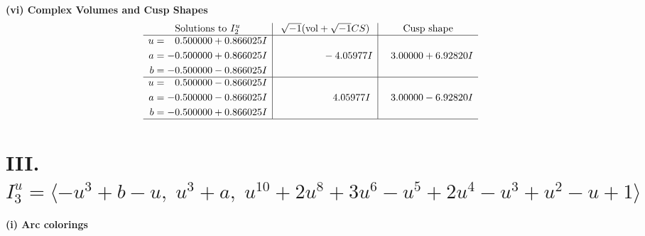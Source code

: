 \documentclass[1p]{elsarticle_modified}
\theoremstyle{definition}
\newcommand{\I}{\sqrt{-1}}
\begin{document}
\newpage\flushleft \textbf{(vi) Complex Volumes and Cusp Shapes}
$$\begin{array}{c|c|c}  
\text{Solutions to }I^u_{2}& \I (\text{vol} + \sqrt{-1}CS) & \text{Cusp shape}\\
 \hline 
\begin{aligned}
u &= \phantom{-}0.500000 + 0.866025 I \\
a &= -0.500000 + 0.866025 I \\
b &= -0.500000 - 0.866025 I\end{aligned}
 & \phantom{-0.000000 } -4.05977 I & \phantom{-}3.00000 + 6.92820 I \\ \hline\begin{aligned}
u &= \phantom{-}0.500000 - 0.866025 I \\
a &= -0.500000 - 0.866025 I \\
b &= -0.500000 + 0.866025 I\end{aligned}
 & \phantom{-0.000000 -}4.05977 I & \phantom{-}3.00000 - 6.92820 I\\
 \hline 
 \end{array}$$\newpage\newpage\renewcommand{\arraystretch}{1}
\centering \section*{III. $I^u_{3}= \langle - u^3+b- u,\;u^3+a,\;u^{10}+2 u^8+3 u^6- u^5+2 u^4- u^3+u^2- u+1 \rangle$}
\flushleft \textbf{(i) Arc colorings}\\
\end{document}
